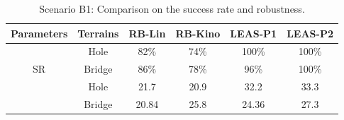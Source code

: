 \begin{table}[h]
\centering
\caption{Scenario B1: Comparison on the success rate and robustness.}
\begin{tabular}{ |c|c|c|c|c|c| }
    \hline
    Parameters & Terrains & RB-Lin & RB-Kino & LEAS-P1 & LEAS-P2\\
    \hline \hline
    \multirow{3}{*}{SR} & Hole & 82\% & 74\% & 100\% & 100\% \\
    \cline{2-6}
                        & Bridge & 86\% & 78\% & 96\% & 100\% \\
    \hline \hline
    \multirow{3}{*}{Robustness} & Hole & 21.7 & 20.9 & 32.2 & 33.3 \\
    \cline{2-6}
                        & Bridge & 20.84 & 25.8 & 24.36 & 27.3 \\
    \hline
\end{tabular}
\label{tab:cp-sb:hole_bridge}
\end{table}
